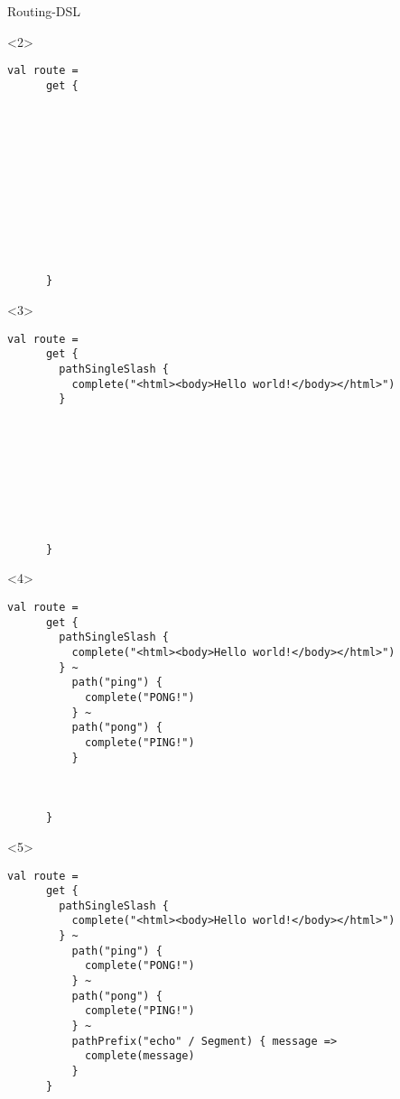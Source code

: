 \documentclass[14pt,aspectratio=169,trans]{beamer} %
\begin{document}
\begin{frame}[fragile]{}
 \begin{block}{Routing-DSL}
\scriptsize
\begin{overlayarea}{\textwidth}{7cm}
	\begin{onlyenv}
  \begin{lstlisting}
val route =
      get {
        
				
				
				
				
				
				
				
				
				
				
          
      }
	\end{lstlisting}
	\end{onlyenv}
	\begin{onlyenv}
	\begin{lstlisting}
val route =
      get {
        pathSingleSlash {
          complete("<html><body>Hello world!</body></html>")
        } 
				
				
				
				
				
				
				
				
				
      }
	\end{lstlisting}
	\end{onlyenv}
	\begin{onlyenv}
  \begin{lstlisting}
val route =
      get {
        pathSingleSlash {
          complete("<html><body>Hello world!</body></html>")
        } ~
          path("ping") {
            complete("PONG!")
          } ~
          path("pong") {
            complete("PING!")
          }
					
					
					
      }
	\end{lstlisting}
	\end{onlyenv}
	\begin{onlyenv}
  \begin{lstlisting}
val route =
      get {
        pathSingleSlash {
          complete("<html><body>Hello world!</body></html>")
        } ~
          path("ping") {
            complete("PONG!")
          } ~
          path("pong") {
            complete("PING!")
          } ~
          pathPrefix("echo" / Segment) { message =>
            complete(message)
          }
      }
	\end{lstlisting}
	\end{onlyenv}
	\end{overlayarea}
\end{block}
\end{frame}
\end{document}
